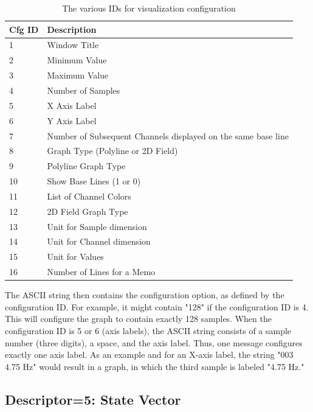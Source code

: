 \documentclass[letterpaper,oneside,12pt]{book}
\begin{document}
\begin{table}[ht]
 \centering
 \begin{tabular}{|l|l|}
  \hline
  \textbf{Cfg ID} & \textbf{Description} \\
  \hline
  1 & Window Title \\
  \hline
  2 & Minimum Value \\
  \hline
  3 & Maximum Value \\
  \hline
  4 & Number of Samples \\
  \hline
  5 & X Axis Label \\
  \hline
  6 & Y Axis Label \\
  \hline
  7 & Number of Subsequent Channels displayed on the same base line \\
  \hline
  8 & Graph Type (Polyline or 2D Field) \\
  \hline
  9 & Polyline Graph Type \\
  \hline
  10 & Show Base Lines (1 or 0) \\
  \hline
  11 & List of Channel Colors \\
  \hline
  12 & 2D Field Graph Type \\
  \hline
  13 & Unit for Sample dimension \\
  \hline
  14 & Unit for Channel dimension \\
  \hline
  15 & Unit for Values \\
  \hline
  16 & Number of Lines for a Memo \\
  \hline
 \end{tabular}
 \caption{The various IDs for visualization configuration}
 \label{tab:viscfg_table}
\end{table} 

The ASCII string then contains the configuration option, as defined by the 
configuration ID. For example, it might contain "128" if the configuration ID 
is 4. This will configure the graph to contain exactly 128 samples. When the 
configuration ID is 5 or 6 (axis labels), the ASCII string consists of a sample 
number (three digits), a space, and the axis label. Thus, one message configures 
exactly one axis label. As an example and for an X-axis label, the string "003 
4.75 Hz" would result in a graph, in which the third sample is labeled "4.75 
Hz."


\subsection{Descriptor=5: State Vector}
\label{statevector}
\end{document}
